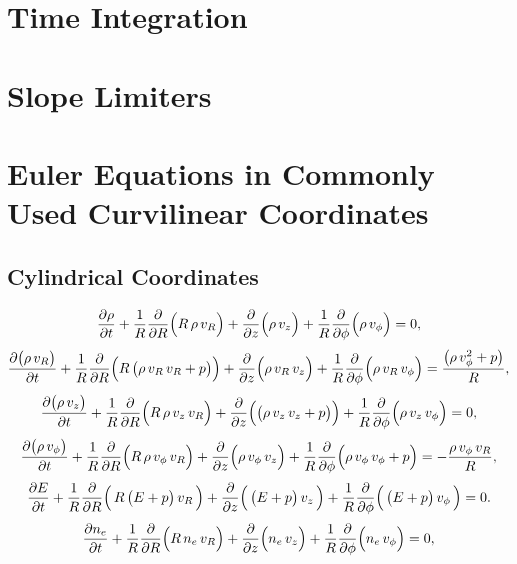 \documentclass[10pt,preprint]{aastex}
\begin{document}
\section{Time Integration}

\section{Slope Limiters}




\appendix

\section{Euler Equations in Commonly Used Curvilinear Coordinates}
\label{app:CurvilinearEuler}

\subsection{Cylindrical Coordinates}

\begin{equation}
  \frac{\partial \rho}{\partial t}
  +\frac{1}{R}\frac{\partial }{\partial R}\Big(R\,\rho\,v_{R}\Big)
  +\frac{\partial }{\partial z}\Big(\rho\,v_{z}\Big)
  +\frac{1}{R}\frac{\partial }{\partial \phi}\Big(\rho\,v_{\phi}\Big)=0,
\end{equation}
\begin{equation}
  \frac{\partial \big(\rho\,v_{R}\big)}{\partial t}
  +\frac{1}{R}\frac{\partial }{\partial R}\Big(R\,\big(\rho\,v_{R}\,v_{R}+p\big)\Big)
  +\frac{\partial }{\partial z}\Big(\rho\,v_{R}\,v_{z}\Big)
  +\frac{1}{R}\frac{\partial }{\partial \phi}\Big(\rho\,v_{R}\,v_{\phi}\Big)
  =\frac{\big(\rho\,v_{\phi}^{2}+p\big)}{R},
\end{equation}
\begin{equation}
  \frac{\partial \big(\rho\,v_{z}\big)}{\partial t}
  +\frac{1}{R}\frac{\partial }{\partial R}\Big(R\,\rho\,v_{z}\,v_{R}\Big)
  +\frac{\partial }{\partial z}\Big(\big(\rho\,v_{z}\,v_{z}+p\big)\Big)
  +\frac{1}{R}\frac{\partial }{\partial \phi}\Big(\rho\,v_{z}\,v_{\phi}\Big)=0,
\end{equation}
\begin{equation}
  \frac{\partial \big(\rho\,v_{\phi}\big)}{\partial t}
  +\frac{1}{R}\frac{\partial }{\partial R}\Big(R\,\rho\,v_{\phi}\,v_{R}\Big)
  +\frac{\partial }{\partial z}\Big(\rho\,v_{\phi}\,v_{z}\Big)
  +\frac{1}{R}\frac{\partial }{\partial \phi}\Big(\rho\,v_{\phi}\,v_{\phi}+p\Big)
  =-\frac{\rho\,v_{\phi}\,v_{R}}{R},
\end{equation}
\begin{equation}
  \frac{\partial E}{\partial t}+\frac{1}{R}\frac{\partial }{\partial R}\Big(\,R\,\big(E+p\big)\,v_{R}\,\Big)+\frac{\partial }{\partial z}\Big(\,\big(E+p\big)\,v_{z}\,\Big)+\frac{1}{R}\frac{\partial }{\partial \phi}\Big(\,\big(E+p\big)\,v_{\phi}\,\Big)=0.
\end{equation}
\begin{equation}
  \frac{\partial n_{e}}{\partial t}
  +\frac{1}{R}\frac{\partial }{\partial R}\Big(R\,n_{e}\,v_{R}\Big)
  +\frac{\partial }{\partial z}\Big(n_{e}\,v_{z}\Big)
  +\frac{1}{R}\frac{\partial }{\partial \phi}\Big(n_{e}\,v_{\phi}\Big)=0,
\end{equation}
\end{document}
